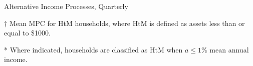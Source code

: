 \documentclass[9pt]{extarticle}
\begin{document}
\begin{table}[h]
\end{table}

\begin{table}[h]
\caption{Alternative Income Processes, Quarterly}
\begin{threeparttable}
\centering


\begin{tablenotes}
	\item[$\dagger$] Mean MPC for HtM households, where HtM is defined as assets less than or equal to \$1000.
	\item[*] Where indicated, households are classified as HtM when $a \leq 1\%$ mean annual income.
\end{tablenotes}
\end{threeparttable}
\end{table}
\end{document}
